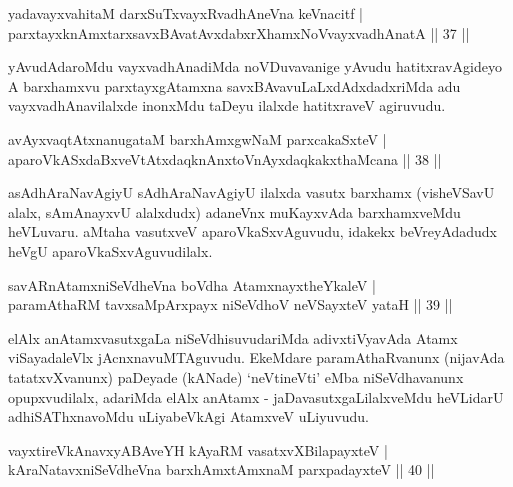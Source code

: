 
\begin{shl}
yadavayxvahitaM darxSuTxvayxRvadhAneVna keVnacitf |\\
parxtayxknAmxtarxsavxBAvatAvxdabxrXhamxNoV\s vayxvadhAnatA \hfill || 37 ||
\end{shl}

\begin{artha}
yAvudAdaroMdu vayxvadhAnadiMda noVDuvavanige yAvudu hatitxravAgideyo A barxhamxvu parxtayxgAtamxna savxBAvavuLaLxdAdxdadxriMda adu vayxvadhAnavilalxde inonxMdu taDeyu ilalxde hatitxraveV agiruvudu.
\end{artha}%


\begin{shl}
avAyxvaqtAtxnanugataM barxhAmxgwNaM parxcakaSxteV |\\
aparoVkASxdaBxveVtAtxdaqknAnxtoV\s nAyxdaqkakxthaMcana \hfill || 38 ||
\end{shl}

\begin{artha}
asAdhAraNavAgiyU sAdhAraNavAgiyU ilalxda vasutx barxhamx (visheVSavU alalx, sAmAnayxvU alalxdudx) adaneVnx muKayxvAda barxhamxveMdu heVLuvaru. aMtaha vasutxveV aparoVkaSxvAguvudu, idakekx beVreyAdadudx heVgU aparoVkaSxvAguvudilalx.
\end{artha}


\begin{shl}
savARnAtamxniSeVdheVna boVdha AtamxnayxtheYkaleV |\\
paramAthaRM tavxsaMpArxpayx niSeVdhoV neVSayxteV yataH \hfill || 39 ||
\end{shl}

\begin{artha}
elAlx anAtamxvasutxgaLa niSeVdhisuvudariMda adivxtiVyavAda Atamx viSayadaleVlx jAcnxnavuMTAguvudu. EkeMdare paramAthaRvanunx (nijavAda tatatxvXvanunx) paDeyade (kANade) `neVtineVti' eMba niSeVdhavanunx opupxvudilalx, adariMda elAlx anAtamx - jaDavasutxgaLilalxveMdu heVLidarU adhiSAThxnavoMdu uLiyabeVkAgi AtamxveV uLiyuvudu.
\end{artha}

\begin{shl}
vayxtireVkAnavxyABAveYH kAyaRM vasatxvXBilapayxteV |\\
kAraNatavxniSeVdheVna barxhAmx\s \s tAmxnaM parxpadayxteV \hfill || 40 ||
\end{shl}

